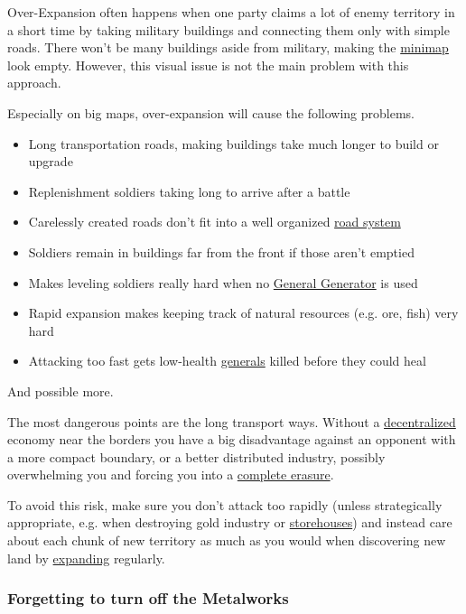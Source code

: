 \documentclass[12pt]{article}
\begin{document}
Over-Expansion often happens when one party claims a lot of enemy territory in a short time by taking military buildings and connecting them only with simple roads. There won't be many buildings aside from military, making the \hyperref[sec:minimap]{minimap} look empty. However, this visual issue is not the main problem with this approach.

Especially on big maps, over-expansion will cause the following problems.

\begin{itemize}
    \item Long transportation roads, making buildings take much longer to build or upgrade
    \item Replenishment soldiers taking long to arrive after a battle
    \item Carelessly created roads don't fit into a well organized \hyperref[sec:roadsystem]{road system}
    \item Soldiers remain in buildings far from the front if those aren't emptied
    \item Makes leveling soldiers really hard when no \hyperref[sec:generalgenerator]{General Generator} is used
    \item Rapid expansion makes keeping track of natural resources (e.g. ore, fish) very hard
    \item Attacking too fast gets low-health \hyperref[sec:general]{generals} killed before they could heal
\end{itemize}

And possible more.

The most dangerous points are the long transport ways. Without a \hyperref[sec:decentralization]{decentralized} economy near the borders you have a big disadvantage against an opponent with a more compact boundary, or a better distributed industry, possibly overwhelming you and forcing you into a \hyperref[sec:completeerasure]{complete erasure}.

To avoid this risk, make sure you don't attack too rapidly (unless strategically appropriate, e.g. when destroying gold industry or \hyperref[sec:storehouse]{storehouses}) and instead care about each chunk of new territory as much as you would when discovering new land by \hyperref[sec:expanding]{expanding} regularly.

\subsubsection{Forgetting to turn off the Metalworks}
\label{sec:forgettingmetalworks}
\end{document}

